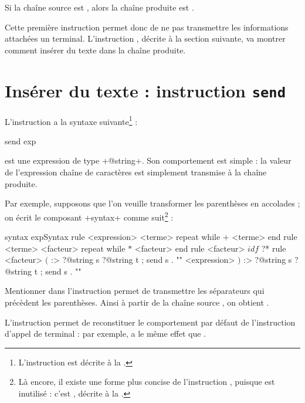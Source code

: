 Si la chaîne source est , alors la chaîne produite est .

Cette première instruction permet donc de ne pas transmettre les informations attachées un terminal. L'instruction , décrite à la section suivante, va montrer comment insérer du texte dans la chaîne produite.










\section{Insérer du texte : instruction \texttt{send}}

L'instruction  a la syntaxe suivante\footnote{L'instruction  est décrite à la .} :
\begin{galgascode}
send exp
\end{galgascode}

 est une expression de type \ggs+@string+. Son comportement est simple : la valeur de l'expression chaîne de caractères est simplement transmise à la chaîne produite.

Par exemple, supposons que l'on veuille transformer les parenthèses en accolades ; on écrit le composant \ggs+syntax+ comme suit\footnote{Là encore, il existe une forme plus concise de l'instruction , puisque  est inutilisé : c'est , décrite  à la .} :
\begin{galgascode}
syntax expSyntax {
  rule <expression> {
    <terme>
    repeat while $+$ <terme> end
  }
  rule <terme> {
    <facteur>
    repeat while $*$ <facteur> end
  }
  rule <facteur> {
    $idf$ ?*
  }
  rule <facteur> {
    $($ :> ?@string s ?@string t ; send s . "{"
    <expression>
    $)$ :> ?@string s ?@string t ; send s . "}"
  }
}
\end{galgascode}

Mentionner  dans l'instruction  permet de transmettre les séparateurs qui précèdent les parenthèses. Ainsi à partir de la chaîne source , on obtient .


L'instruction  permet de reconstituer le comportement par défaut de l'instruction d'appel de terminal : par exemple,  a le même effet que \galgas{$($ ;}.


